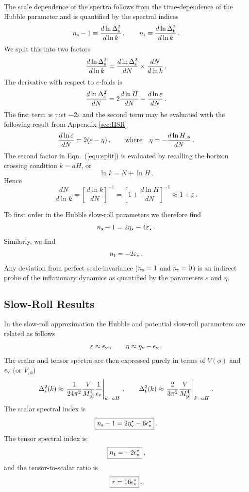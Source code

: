 \documentclass[12pt,letterpaper,rotate]{article}
\def\beq{\begin{equation}}
\def\eeq{\end{equation}}
\def\Mp{M_{\rm pl}}
\begin{document}
{The scale dependence of the spectra follows from the time-dependence of the Hubble parameter and is quantified by the spectral indices
\beq
n_{\rm s} - 1  \equiv \frac{d \ln \Delta_{\rm s}^2 }{d \ln k} \, , \qquad n_{\rm  t}   \equiv \frac{d \ln \Delta_{\rm t}^2 }{d \ln k}\, .
\eeq  
We split this into two factors
\beq
\label{equ:split}
\frac{d \ln \Delta_{\rm s}^2 }{d \ln k} = \frac{d \ln \Delta_{\rm s}^2 }{d N} \times \frac{d N}{d \ln k} \, .
\eeq
The derivative with respect to $e$-folds is
\beq
 \frac{d \ln \Delta_{\rm s}^2 }{d N} = 2 \frac{d \ln H}{d N} - \frac{d \ln \varepsilon}{d N}\, .
\eeq
The first term is just $-2 \varepsilon$ and the second term may be evaluated with the following result from Appendix \ref{sec:HSR}
\beq
\frac{d \ln \varepsilon}{d N} = 2(\varepsilon - \eta)\, , \qquad {\rm where} \quad \eta = - \frac{d \ln H_{, \phi}}{d N}\, .
\eeq
The second factor in Eqn.~(\ref{equ:split}) is evaluated by recalling the horizon crossing condition $k = a H$, or
\beq
\ln k = N + \ln H\, .
\eeq
Hence
\beq
\frac{d N}{d \ln k}= \left[ \frac{d \ln k}{d N} \right]^{-1}  = \left[ 1 + \frac{d \ln H}{d N}\right]^{-1} \approx 1+ \varepsilon\, .
\eeq

To first order in the Hubble slow-roll parameters we therefore find
\beq
n_{\rm s} - 1 =  2\eta_\star - 4 \varepsilon_\star\, .
\eeq
Similarly, we find
\beq
n_{\rm t} = - 2 \varepsilon_\star\, .
\eeq
Any deviation from perfect scale-invariance ($n_{\rm s} = 1$ and $n_{\rm t}=0$)
is an indirect probe of the inflationary dynamics as quantified by the parameters $\varepsilon$ and $\eta$.

\subsection{Slow-Roll Results}

In the slow-roll approximation the Hubble and potential slow-roll parameters are related as follows
\beq
\varepsilon \approx \epsilon_{\rm v} \, , \qquad \eta \approx \eta_{\rm v} - \epsilon_{\rm v}\, .
\eeq
The scalar and tensor spectra are then expressed purely in terms of $V(\phi)$ and $\epsilon_{\rm v}$ (or $V_{,\phi}$)
\beq
\label{equ:SSRx}
\Delta^2_{\rm s}(k) \approx \left. \frac{1}{24\pi^2}\frac{V}{\Mp^4}  \frac{1}{\epsilon_{\rm v}} \right|_{k=aH} \, ,
\qquad
\Delta^2_{\rm t}(k) \approx \left. \frac{2}{3\pi^2} \frac{V}{\Mp^4} \right|_{k=aH} \, .
\eeq
The scalar spectral index is
\beq
\fbox{$\displaystyle
n_{\rm s} - 1  =2 \eta_{\rm v}^\star - 6 \epsilon_{\rm v}^\star $}\, .
\eeq
The tensor spectral index is
\beq
\fbox{$\displaystyle
n_{\rm t} = - 2 \epsilon_{\rm v}^\star$}\, ,
\eeq
and the tensor-to-scalar ratio is
\beq
\fbox{$\displaystyle r = 16 \epsilon_{\rm v}^\star $}\, .
\eeq


}
\end{document}
